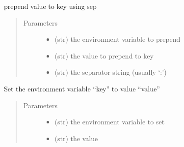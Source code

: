 \documentclass[a4paper,10pt,english]{sphinxmanual}
\begin{document}
\begin{fulllineitems}
\begin{fulllineitems}
\end{fulllineitems}


\begin{fulllineitems}
\label{\detokenize{apidoc_src/src:src.environment.Environ.prepend_value}}
prepend value to key using sep
\begin{quote}\begin{description}
\item[{Parameters}] \leavevmode\begin{itemize}
\item {} 
 \textendash{} (str) the environment variable to prepend

\item {} 
 \textendash{} (str) the value to prepend to key

\item {} 
 \textendash{} (str) the separator string (usually ‘:’)

\end{itemize}

\end{description}\end{quote}

\end{fulllineitems}


\begin{fulllineitems}
\label{\detokenize{apidoc_src/src:src.environment.Environ.set}}
Set the environment variable “key” to value “value”
\begin{quote}\begin{description}
\item[{Parameters}] \leavevmode\begin{itemize}
\item {} 
 \textendash{} (str) the environment variable to set

\item {} 
 \textendash{} (str) the value

\end{itemize}

\end{description}\end{quote}

\end{fulllineitems}


\end{fulllineitems}
\end{document}
